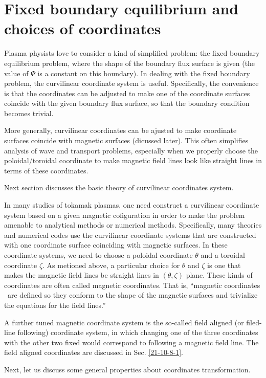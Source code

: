 \documentclass{llncs}
\begin{document}
\section{Fixed boundary equilibrium and choices of coordinates}

Plasma physists love to consider a kind of simplified problem: the fixed
boundary equilibrium problem, where the shape of the boundary flux surface is
given (the value of $\Psi$ is a constant on this boundary). In dealing with
the fixed boundary problem, the curvilinear coordinate system is useful.
Specifically, the convenience is that the coordinates can be adjusted to make
one of the coordinate surfaces coincide with the given boundary flux surface,
so that the boundary condition becomes trivial.

More generally, curvilinear coordinates can be ajusted to make coordinate
surfaces coincide with magnetic surfaces (dicussed later). This often
simplifies analysis of wave and transport problems, especially when we
properly choose the poloidal/toroidal coordinate to make magnetic field lines
look like straight lines in terms of these coordinates.

Next section discusses the basic theory of curvilinear coordinates
system{\cite{boozer2005}}.

In many studies of tokamak plasmas, one need construct a curvilinear
coordinate system based on a given magnetic cofiguration in order to make the
problem amenable to analytical methods or numerical methods. Specifically,
many theories and numerical codes use the curvilinear coordinate systems that
are constructed with one coordinate surface coinciding with magnetic surfaces.
In these coordinate systems, we need to choose a poloidal coordinate $\theta$
and a toroidal coordinate $\zeta$. As metioned above, a particular choice for
$\theta$ and $\zeta$ is one that makes the magnetic field lines be straight
lines in $(\theta, \zeta)$ plane. These kinds of coordinates are often called
magnetic coordinates. That is, ``magnetic coordinates \ are defined so they
conform to the shape of the magnetic surfaces and trivialize the equations for
the field lines.''

A further tuned magnetic coordinate system is the so-called field aligned (or
filed-line following) coordinate system, in which changing one of the three
coordinates with the other two fixed would correspond to following a magnetic
field line. The field aligned coordinates are discussed in Sec.
\ref{21-10-8-1}.

Next, let us discuss some general properties about coordinates transformation.
\end{document}

